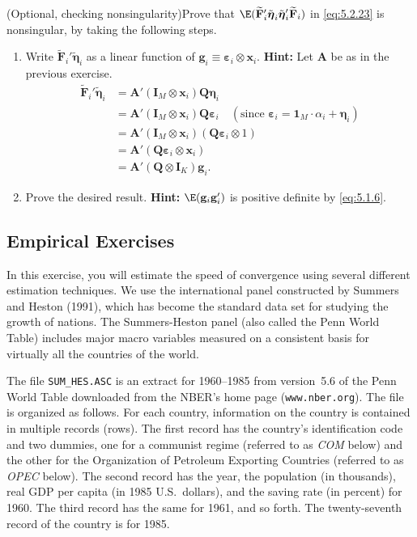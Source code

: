 \begin{problemset}
\exercise[7]
(Optional, checking nonsingularity)\quad Prove that
$\E(\widetilde{\mathbf{F}}_i'\tilde{\boldsymbol{\eta}}_i\tilde{\boldsymbol{\eta}}_i'\widetilde{\mathbf{F}}_i)$
in \eqref{eq:5.2.23} is nonsingular, by taking the following steps.

\begin{enumerate}[label=(\alph*)]
\item Write $\widetilde{\mathbf{F}}_i'\tilde{\boldsymbol{\eta}}_i$ as a linear function of
  $\mathbf{g}_i \equiv \boldsymbol{\varepsilon}_i \otimes \mathbf{x}_i$.
  \textbf{Hint:} Let $\mathbf{A}$ be as in the
  previous exercise.
  \begin{align*}
    \widetilde{\mathbf{F}}_i'\tilde{\boldsymbol{\eta}}_i
    &= \mathbf{A}'(\mathbf{I}_M \otimes \mathbf{x}_i)\mathbf{Q}\boldsymbol{\eta}_i \\
    &= \mathbf{A}'(\mathbf{I}_M \otimes \mathbf{x}_i)\mathbf{Q}\boldsymbol{\varepsilon}_i
    \quad (\text{since } \boldsymbol{\varepsilon}_i = \mathbf{1}_M \cdot \alpha_i + \boldsymbol{\eta}_i) \\
    &= \mathbf{A}'(\mathbf{I}_M \otimes \mathbf{x}_i)(\mathbf{Q}\boldsymbol{\varepsilon}_i \otimes 1) \\
    &= \mathbf{A}'(\mathbf{Q}\boldsymbol{\varepsilon}_i \otimes \mathbf{x}_i) \\
    &= \mathbf{A}'(\mathbf{Q} \otimes \mathbf{I}_K)\mathbf{g}_i.
  \end{align*}

\item Prove the desired result. \textbf{Hint:} $\E(\mathbf{g}_i\mathbf{g}_i')$ is positive definite by
  \eqref{eq:5.1.6}.
\end{enumerate}

\subsection*{Empirical Exercises}

In this exercise, you will estimate the speed of convergence using several different
estimation techniques. We use the international panel constructed by Summers and
Heston (1991), which has become the standard data set for studying the growth of
nations. The Summers-Heston panel (also called the Penn World Table) includes
major macro variables measured on a consistent basis for virtually all the countries
of the world.

The file \texttt{SUM\_HES.ASC} is an extract for 1960--1985 from version~5.6 of the
Penn World Table downloaded from the NBER's home page (\texttt{www.nber.org}). The
file is organized as follows. For each country, information on the country is contained
in multiple records (rows). The first record has the country's identification
code and two dummies, one for a communist regime (referred to as \emph{COM}
below) and the other for the Organization of Petroleum Exporting Countries (referred to as
\emph{OPEC} below). The second record has the year, the population (in thousands), real
GDP per capita (in 1985 U.S.\ dollars), and the saving rate (in percent) for 1960.
The third record has the same for 1961, and so forth. The twenty-seventh record of
the country is for 1985.


\end{problemset}
